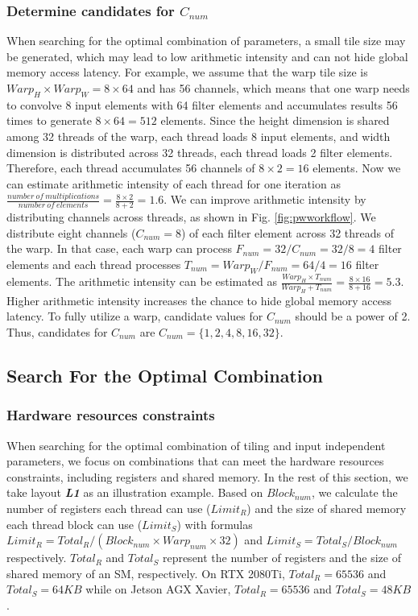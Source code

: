 \subsubsection{Determine candidates for $C_{num}$}
When searching for the optimal combination of parameters, a small tile size may be generated, which may lead to low arithmetic intensity and can not hide global memory access latency.
 For example, we assume that the warp tile size is $Warp_H \times Warp_W = 8 \times 64$ and has 56 channels, which means that one warp needs to convolve 8 input elements with 64 filter elements and accumulates results 56 times to generate $8 \times 64=512$ elements. Since the height dimension is shared among 32 threads of the warp, each thread loads 8 input elements, and width dimension is distributed across 32 threads, each thread loads 2 filter elements. Therefore, each thread accumulates 56 channels of $8 \times 2=16$ elements. Now we can estimate arithmetic intensity of each thread for one iteration as $\frac{number\ of\ multiplications}{number\ of\ elements}=\frac{8 \times 2}{8 + 2}=1.6$. We can improve arithmetic intensity by distributing channels across threads, as shown in Fig. \ref{fig:pwworkflow}. We distribute eight channels ($C_{num}=8$) of each filter element across 32 threads of the warp.
 In that case, each warp can process $F_{num}=32/C_{num}=32/8=4$ filter elements and each thread processes $T_{num}=Warp_W/F_{num}=64/4=16$ filter elements.
 The arithmetic intensity can be estimated as $\frac{Warp_H \times T_{num}}{Warp_H + T_{num}}=\frac{8 \times 16}{8+16}=5.3$.
 Higher arithmetic intensity increases the chance to hide global memory access latency.
To fully utilize a warp, candidate values for $C_{num}$ should be a power of 2.
Thus, candidates for $C_{num}$ are $C_{num}=\{1,2,4,8,16,32\}$.


\subsection{Search For the Optimal Combination}
\subsubsection{Hardware resources constraints}
When searching for the optimal combination of tiling and input independent parameters, we focus on combinations that can meet the hardware resources constraints,
including registers and shared memory. In the rest of this section, we take layout \textbf{\emph{L1}} as an illustration example. Based on
$Block_{num}$, we calculate the number of registers each thread can use ($Limit_R$) and the size of shared memory each thread block can use
($Limit_S$) with formulas $Limit_R=Total_R/(Block_{num}\times Warp_{num} \times 32)$ and $Limit_S=Total_S/Block_{num}$ respectively.
$Total_R$ and $Total_S$ represent the number of registers and the size of shared memory of an SM, respectively. On RTX 2080Ti,
$Total_R=65536$ and $Total_S=64KB$ while  on Jetson AGX Xavier, $Total_R=65536$ and $Total_S=48KB$.

